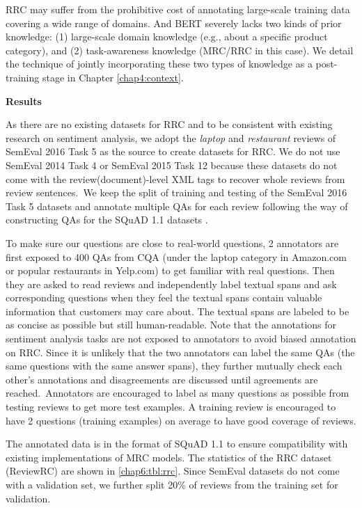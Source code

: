 RRC may suffer from the prohibitive cost of annotating large-scale training data covering a wide range of domains. 
And BERT severely lacks two kinds of prior knowledge: (1) large-scale domain knowledge (e.g., about a specific product category), and (2) task-awareness knowledge (MRC/RRC in this case).
We detail the technique of jointly incorporating these two types of knowledge as a post-training stage in Chapter \ref{chap4:context}.

\textbf{Results}

As there are no existing datasets for RRC and
to be consistent with existing research on sentiment analysis, we adopt the \textit{laptop} and \textit{restaurant} reviews of SemEval 2016 Task 5 as the source to create datasets for RRC.
We do not use SemEval 2014 Task 4 or SemEval 2015 Task 12 because these datasets do not come with the review(document)-level XML tags to recover whole reviews from review sentences.~We keep the split of training and testing of the SemEval 2016 Task 5 datasets and annotate multiple QAs for each review following the way of constructing QAs for the SQuAD 1.1 datasets \cite{rajpurkar2016squad}.

To make sure our questions are close to real-world questions, 2 annotators are first exposed to 400 QAs from CQA (under the laptop category in Amazon.com or popular restaurants in Yelp.com) to get familiar with real questions.
Then they are asked to read reviews and independently label textual spans and ask corresponding questions when they feel the textual spans contain valuable information that customers may care about.
The textual spans are labeled to be as concise as possible but still human-readable.
Note that the annotations for sentiment analysis tasks are not exposed to annotators to avoid biased annotation on RRC.
Since it is unlikely that the two annotators can label the same QAs (the same questions with the same answer spans), they further mutually check each other's annotations and disagreements are discussed until agreements are reached.~Annotators are encouraged to label as many questions as possible from testing reviews to get more test examples. A training review is encouraged to have 2 questions (training examples) on average to have good coverage of reviews.

The annotated data is in the format of SQuAD 1.1 \cite{rajpurkar2016squad} to ensure compatibility with existing implementations of MRC models. The statistics of the RRC dataset (ReviewRC) are shown in \ref{chap6:tbl:rrc}. 
Since SemEval datasets do not come with a validation set, we further split 20\% of reviews from the training set for validation.

